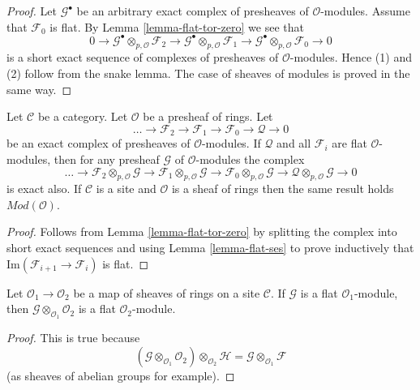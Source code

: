 \begin{proof}
Let $\mathcal{G}^\bullet$ be an arbitrary exact complex of presheaves
of $\mathcal{O}$-modules. Assume that $\mathcal{F}_0$ is flat.
By Lemma \ref{lemma-flat-tor-zero} we see that
$$
0 \to
\mathcal{G}^\bullet \otimes_{p, \mathcal{O}} \mathcal{F}_2 \to
\mathcal{G}^\bullet \otimes_{p, \mathcal{O}} \mathcal{F}_1 \to
\mathcal{G}^\bullet \otimes_{p, \mathcal{O}} \mathcal{F}_0 \to 0
$$
is a short exact sequence of complexes of presheaves of
$\mathcal{O}$-modules. Hence (1) and (2) follow from the snake lemma.
The case of sheaves of modules is proved in the same way.
\end{proof}

\begin{lemma}
\label{lemma-flat-resolution-of-flat}
Let $\mathcal{C}$ be a category.
Let $\mathcal{O}$ be a presheaf of rings.
Let
$$
\ldots \to
\mathcal{F}_2 \to
\mathcal{F}_1 \to
\mathcal{F}_0 \to
\mathcal{Q} \to 0
$$
be an exact complex of presheaves of $\mathcal{O}$-modules.
If $\mathcal{Q}$ and all $\mathcal{F}_i$ are flat $\mathcal{O}$-modules,
then for any presheaf $\mathcal{G}$ of $\mathcal{O}$-modules the
complex
$$
\ldots \to
\mathcal{F}_2 \otimes_{p, \mathcal{O}} \mathcal{G} \to
\mathcal{F}_1 \otimes_{p, \mathcal{O}} \mathcal{G} \to
\mathcal{F}_0 \otimes_{p, \mathcal{O}} \mathcal{G} \to
\mathcal{Q} \otimes_{p, \mathcal{O}} \mathcal{G} \to 0
$$
is exact also. If $\mathcal{C}$ is a site and $\mathcal{O}$ is a
sheaf of rings then the same result holds $\textit{Mod}(\mathcal{O})$.
\end{lemma}

\begin{proof}
Follows from Lemma \ref{lemma-flat-tor-zero} by splitting the complex
into short exact sequences and using Lemma \ref{lemma-flat-ses} to
prove inductively that $\text{Im}(\mathcal{F}_{i + 1} \to \mathcal{F}_i)$
is flat.
\end{proof}

\begin{lemma}
\label{lemma-flat-change-of-rings}
Let $\mathcal{O}_1 \to \mathcal{O}_2$ be a map of sheaves
of rings on a site $\mathcal{C}$. If $\mathcal{G}$ is a
flat $\mathcal{O}_1$-module, then
$\mathcal{G} \otimes_{\mathcal{O}_1} \mathcal{O}_2$
is a flat $\mathcal{O}_2$-module.
\end{lemma}

\begin{proof}
This is true because
$$
(\mathcal{G} \otimes_{\mathcal{O}_1} \mathcal{O}_2)
\otimes_{\mathcal{O}_2} \mathcal{H}
=
\mathcal{G} \otimes_{\mathcal{O}_1} \mathcal{F}
$$
(as sheaves of abelian groups for example).
\end{proof}








